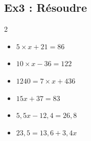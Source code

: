 \subsection*{Ex3 : Résoudre}

\begin{multicols}{2} 

\begin{itemize}[label={$\bullet$}]
  \item $ 5 \times x + 21 = 86 $ \\
  \item $ 10 \times x - 36 = 122 $ \\
  \item $ 1240 = 7 \times x + 436 $ \\ \columnbreak
  \item $ 15x + 37 = 83$ \\
  \item $ 5,5x - 12,4 = 26,8$ \\
  \item $ 23,5 = 13,6 + 3,4x$ \\
\end{itemize}
\end{multicols}


